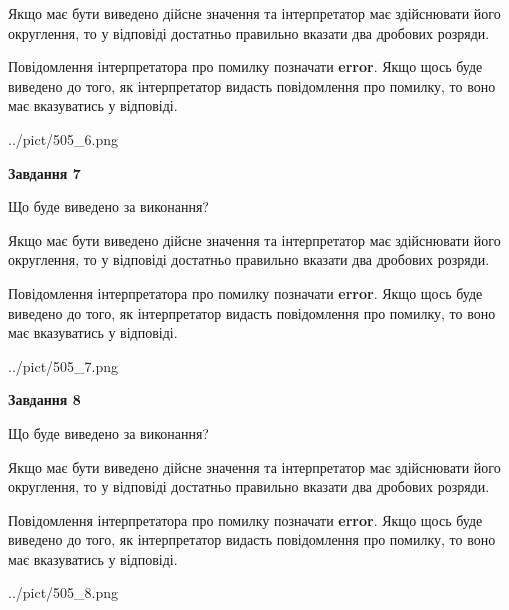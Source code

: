 \documentclass[12pt, ukrainian]{article}
\begin{document}
{\begin {Large}
Якщо має бути виведено дійсне значення та інтерпретатор має здійснювати його округлення, 
то у відповіді достатньо правильно вказати два дробових розряди.

Повідомлення інтерпретатора про помилку позначати \textbf{error}.
Якщо щось буде виведено до того, як інтерпретатор видасть повідомлення про помилку, 
то воно має вказуватись у відповіді. \par

\begin{center}
	{../pict/505_6.png}
\end{center}
\newpage

{\begin {center}\textbf{Завдання 7}\end {center}}\par
Що буде виведено за виконання? \par

Якщо має бути виведено дійсне значення та інтерпретатор має здійснювати його округлення, 
то у відповіді достатньо правильно вказати два дробових розряди.

Повідомлення інтерпретатора про помилку позначати \textbf{error}.
Якщо щось буде виведено до того, як інтерпретатор видасть повідомлення про помилку, 
то воно має вказуватись у відповіді. \par

\begin{center}
	{../pict/505_7.png}
\end{center}
\newpage

{\begin {center}\textbf{Завдання 8}\end {center}}\par
Що буде виведено за виконання? \par

Якщо має бути виведено дійсне значення та інтерпретатор має здійснювати його округлення, 
то у відповіді достатньо правильно вказати два дробових розряди.

Повідомлення інтерпретатора про помилку позначати \textbf{error}.
Якщо щось буде виведено до того, як інтерпретатор видасть повідомлення про помилку, 
то воно має вказуватись у відповіді. \par

\begin{center}
	{../pict/505_8.png}
\end{center}
\newpage


\end{Large}}
\end{document}
